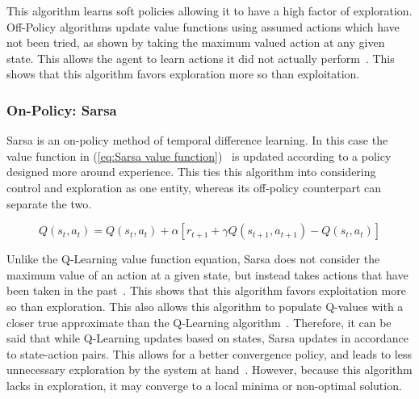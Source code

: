 \documentclass[12pt,american]{report}
\begin{document}
        This algorithm learns soft policies allowing it to have a high factor of exploration. Off-Policy algorithms update value functions using assumed actions which have not been tried, as shown by taking the maximum valued action at any given state.  This allows the agent to learn actions it did not actually perform~\cite{Eden}. This shows that this algorithm favors exploration more so than exploitation.  
        
        \subsubsection{On-Policy: Sarsa}
        Sarsa is an on-policy method of temporal difference learning. In this case the value function in (\ref{eq:Sarsa value function})~\cite{sprague2003multiple} is updated according to a policy designed more around experience.  This ties this algorithm into considering control and exploration as one entity, whereas its off-policy counterpart can separate the two.
        
        \begin{equation}
            \label{eq:Sarsa value function}
            Q(s_{t},a_{t}) = Q(s_{t},a_{t}) + \alpha[r_{t+1} + \gamma Q(s_{t+1},a_{t+1})-Q(s_{t},a_{t})]
        \end{equation}
        
        Unlike the Q-Learning value function equation, Sarsa does not consider the maximum value of an action at a given state, but instead takes actions that have been taken in the past~\cite{Eden}. This shows that this algorithm favors exploitation more so than exploration. This also allows this algorithm to populate Q-values with a closer true approximate than the Q-Learning algorithm~\cite{sprague2003multiple}. Therefore, it can be said that while Q-Learning updates based on states, Sarsa updates in accordance to state-action pairs.  This allows for a better convergence policy, and leads to less unnecessary exploration by the system at hand~\cite{sutton1996generalization}.  However, because this algorithm lacks in exploration, it may converge to a local minima or non-optimal solution.
        
\end{document}
